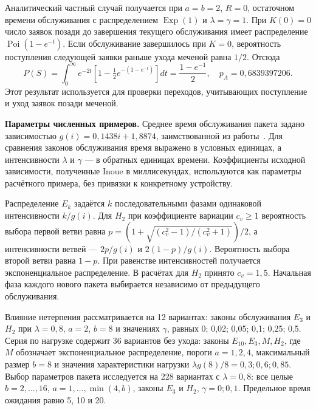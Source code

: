 Аналитический частный случай получается при $a=b=2$, $R=0$, остаточном времени обслуживания с распределением $\operatorname{Exp}(1)$ и $\lambda=\gamma=1$. При $K(0)=0$ число заявок позади до завершения текущего обслуживания имеет распределение $\operatorname{Poi}(1-e^{-t})$. Если обслуживание завершилось при $K=0$, вероятность поступления следующей заявки раньше ухода меченой равна $1/2$. Отсюда
\begin{equation}
 P(S)=\int_0^\infty e^{-2t}\left[1-\tfrac12 e^{-(1-e^{-t})}\right]dt
 =\frac{1-e^{-1}}2,\quad p_A=0{,}6839397206.
\end{equation}
Этот результат используется для проверки переходов, учитывающих поступление и уход заявок позади меченой.

\noindent\textbf{Параметры численных примеров.}
Среднее время обслуживания пакета задано зависимостью $g(i)=0{,}1438i+1{,}8874$, заимствованной из работы~\cite{inoue2021}. Для сравнения законов обслуживания время выражено в условных единицах, а интенсивности $\lambda$ и $\gamma$ --- в обратных единицах времени. Коэффициенты исходной зависимости, полученные Inoue в миллисекундах, используются как параметры расчётного примера, без привязки к конкретному устройству.

Распределение $E_k$ задаётся $k$ последовательными фазами одинаковой интенсивности $k/g(i)$. Для $H_2$ при коэффициенте вариации $c_v\geq1$ вероятность выбора первой ветви равна $p=(1+\sqrt{(c_v^2-1)/(c_v^2+1)})/2$, а интенсивности ветвей --- $2p/g(i)$ и $2(1-p)/g(i)$. Вероятность выбора второй ветви равна $1-p$. При равенстве интенсивностей получается экспоненциальное распределение. В расчётах для $H_2$ принято $c_v=1{,}5$. Начальная фаза каждого нового пакета выбирается независимо от предыдущего обслуживания.

Влияние нетерпения рассматривается на 12 вариантах: законы обслуживания $E_3$ и $H_2$ при $\lambda=0{,}8$, $a=2$, $b=8$ и значениях $\gamma$, равных 0; 0,02; 0,05; 0,1; 0,25; 0,5. Серия по нагрузке содержит 36 вариантов без ухода: законы $E_{10},E_3,M,H_2$, где $M$ обозначает экспоненциальное распределение, пороги $a=1,2,4$, максимальный размер $b=8$ и значения характеристики нагрузки $\lambda g(8)/8=0{,}3;0{,}6;0{,}85$. Выбор параметров пакета исследуется на 228 вариантах с $\lambda=0{,}8$: все целые $b=2,\ldots,16$, $a=1,\ldots,\min(4,b)$, законы $E_3$ и $H_2$, $\gamma=0;0{,}1$. Предельное время ожидания равно 5, 10 и 20.

